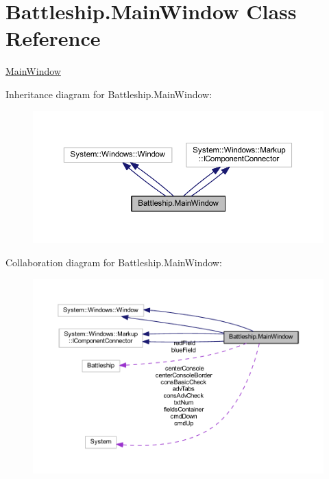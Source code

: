 \hypertarget{class_battleship_1_1_main_window}{\section{Battleship.\-Main\-Window Class Reference}
\label{class_battleship_1_1_main_window}
}


\hyperlink{class_battleship_1_1_main_window}{Main\-Window}  




Inheritance diagram for Battleship.\-Main\-Window\-:\nopagebreak
\begin{figure}[H]
\begin{center}
\leavevmode
\includegraphics[width=350pt]{class_battleship_1_1_main_window__inherit__graph}
\end{center}
\end{figure}


Collaboration diagram for Battleship.\-Main\-Window\-:\nopagebreak
\begin{figure}[H]
\begin{center}
\leavevmode
\includegraphics[width=350pt]{class_battleship_1_1_main_window__coll__graph}
\end{center}
\end{figure}
